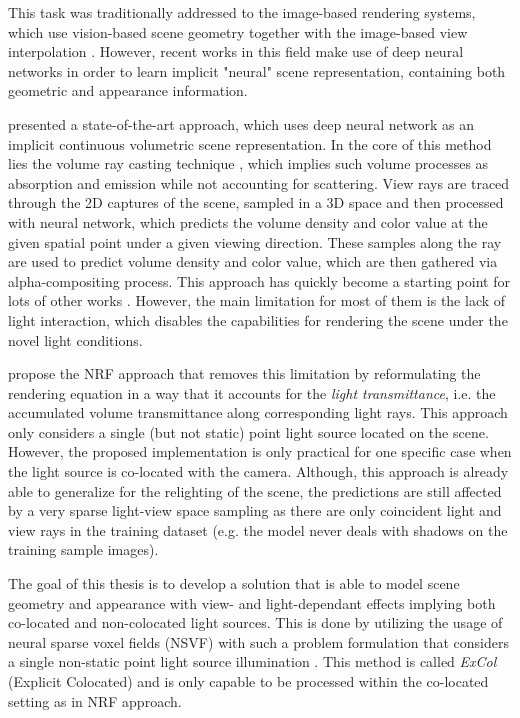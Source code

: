 This task was traditionally addressed to the image-based rendering systems,
which use vision-based scene geometry together with the image-based view interpolation \cite{shumandkang2000}.
However, recent works in this field make use of deep neural networks
in order to learn implicit "neural" scene representation,
containing both geometric and appearance information. \cite{tewari2020state}

\cite{mildenhall2020nerf} presented a state-of-the-art approach,
which uses deep neural network as an implicit continuous volumetric scene representation.
In the core of this method lies the volume ray casting technique \cite{drebin1988volume},
which implies such volume processes as absorption and emission
while not accounting for scattering.
View rays are traced through the 2D captures of the scene,
sampled in a 3D space and then processed with neural network,
which predicts the volume density and color value at the given spatial point under a given viewing direction.
These samples along the ray are used to predict volume density and color value,
which are then gathered via alpha-compositing process.
This approach has quickly become a starting point for lots of other works \cite{liu2021neural, garbin2021fastnerf, reiser2021kilonerf, yu2021plenoctrees, rebain2020derf, lindell2021autoint}.
However, the main limitation for most of them is the lack of light interaction,
which disables the capabilities for rendering the scene under the novel light conditions.

\cite{bi2020neural} propose the NRF approach
that removes this limitation by reformulating the rendering equation in a way
that it accounts for the \textit{light transmittance},
i.e. the accumulated volume transmittance along corresponding light rays.
This approach only considers a single (but not static) point light source located on the scene.
However, the proposed implementation is only practical for one specific case
when the light source is co-located with the camera.
Although, this approach is already able to generalize for the relighting of the scene,
the predictions are still affected by a very sparse light-view space sampling
as there are only coincident light and view rays in the training dataset
(e.g. the model never deals with shadows on the training sample images).


The goal of this thesis is to develop a solution
that is able to model scene geometry and appearance with view- and light-dependant effects
implying both co-located and non-colocated light sources.
This is done by utilizing the usage of neural sparse voxel fields (NSVF) \cite{liu2021neural}
with such a problem formulation that considers a single non-static point light source illumination \cite{bi2020neural}.
This method is called \textit{ExCol} (Explicit Colocated) and is only capable
to be processed within the co-located setting as in NRF approach.


